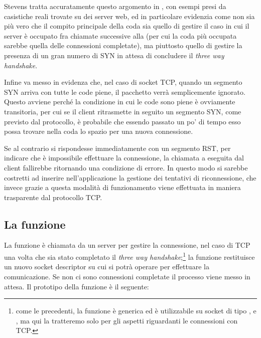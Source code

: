 Stevens tratta accuratamente questo argomento in \cite{UNP1}, con esempi presi
da casistiche reali trovate su dei server web, ed in particolare evidenzia
come non sia più vero che il compito principale della coda sia quello di
gestire il caso in cui il server è occupato fra chiamate successive alla
 (per cui la coda più occupata sarebbe quella delle connessioni
completate), ma piuttosto quello di gestire la presenza di un gran numero di
SYN in attesa di concludere il \textit{three way handshake}.

Infine va messo in evidenza che, nel caso di socket TCP, quando un segmento
SYN arriva con tutte le code piene, il pacchetto verrà semplicemente
ignorato. Questo avviene perché la condizione in cui le code sono piene è
ovviamente transitoria, per cui se il client ritrasmette in seguito un
segmento SYN, come previsto dal protocollo, è probabile che essendo passato un
po' di tempo esso possa trovare nella coda lo spazio per una nuova
connessione.

Se al contrario si rispondesse immediatamente con un segmento RST, per
indicare che è impossibile effettuare la connessione, la chiamata a
 eseguita dal client fallirebbe ritornando una condizione di
errore. In questo modo si sarebbe costretti ad inserire nell'applicazione la
gestione dei tentativi di riconnessione, che invece grazie a questa modalità
di funzionamento viene effettuata in maniera trasparente dal protocollo
TCP.


\subsection{La funzione }
\label{sec:TCP_func_accept}

La funzione  è chiamata da un server per gestire la connessione,
nel caso di TCP una volta che sia stato completato il \textit{three way
  handshake};\footnote{come le precedenti, la funzione è generica ed è
  utilizzabile su socket di tipo , 
  e , ma qui la tratteremo solo per gli aspetti riguardanti
  le connessioni con TCP.} la funzione restituisce un nuovo socket descriptor
su cui si potrà operare per effettuare la comunicazione. Se non ci sono
connessioni completate il processo viene messo in attesa. Il prototipo della
funzione è il seguente:

